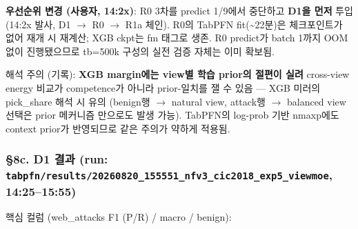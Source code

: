 \textbf{우선순위 변경 (사용자, 14:2x)}: R0 3차를 predict 1/\allowbreak{}9에서 중단하고 \textbf{D1을 먼저} 투입 (14:2x 발사, D1  \ensuremath{\rightarrow}  R0  \ensuremath{\rightarrow}  R1a 체인). R0의 TabPFN fit(\textasciitilde{}22분)은 체크포인트가 없어 재개 시 재계산; XGB ckpt는 fm 태그로 생존. R0 predict가 batch 1까지 OOM 없이 진행됐으므로 tb=\allowbreak{}500k 구성의 실전 검증 자체는 이미 확보됨.

해석 주의 (기록): \textbf{XGB margin에는 view별 학습 prior의 절편이 실려} cross-view energy 비교가 competence가 아니라 prior-일치를 잴 수 있음 — XGB 미러의 pick\_\allowbreak{}share 해석 시 유의 (benign행 \ensuremath{\rightarrow} natural view, attack행 \ensuremath{\rightarrow} balanced view 선택은 prior 메커니즘 만으로도 발생 가능). TabPFN의 log-prob 기반 nmaxp에도 context prior가 반영되므로 같은 주의가 약하게 적용됨.

\subsubsection{§8c. D1 결과 (run: \texttt{tabpfn/\allowbreak{}\allowbreak{}r\allowbreak{}esults/\allowbreak{}\allowbreak{}2\allowbreak{}0260820\_\allowbreak{}\allowbreak{}155551\_\allowbreak{}\allowbreak{}n\allowbreak{}fv3\_\allowbreak{}\allowbreak{}cic2\allowbreak{}018\_\allowbreak{}\allowbreak{}exp5\allowbreak{}\_\allowbreak{}\allowbreak{}viewmoe\allowbreak{}}, 14:25–15:55)}
핵심 컬럼 (web\_\allowbreak{}attacks F1 (P/\allowbreak{}R) /\allowbreak{} macro /\allowbreak{} benign):


